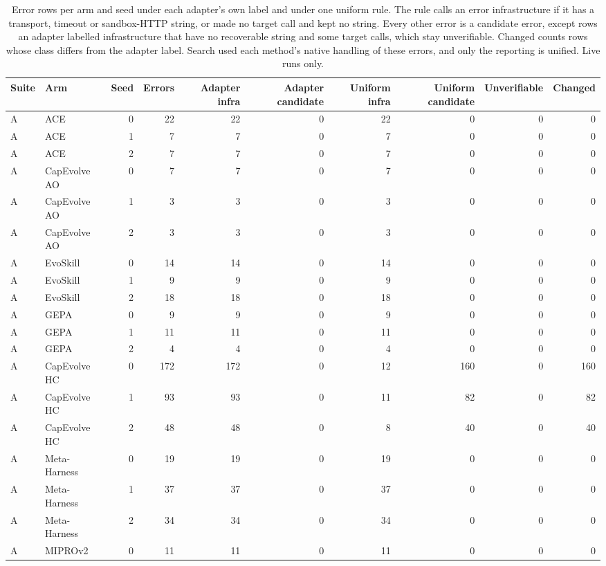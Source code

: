 \begin{table}[t]
\centering\scriptsize
\setlength{\tabcolsep}{4pt}
\caption{Error rows per arm and seed under each adapter's own label and under one uniform rule. The rule calls an error infrastructure if it has a transport, timeout or sandbox-HTTP string, or made no target call and kept no string. Every other error is a candidate error, except rows an adapter labelled infrastructure that have no recoverable string and some target calls, which stay unverifiable. Changed counts rows whose class differs from the adapter label. Search used each method's native handling of these errors, and only the reporting is unified. Live runs only.}
\label{tab:zeros}
\begin{tabular}{@{}llrrrrrrrr@{}}
\toprule
Suite & Arm & Seed & Errors & Adapter infra & Adapter candidate & Uniform infra & Uniform candidate & Unverifiable & Changed \\
\midrule
A & ACE & 0 & 22 & 22 & 0 & 22 & 0 & 0 & 0 \\
A & ACE & 1 & 7 & 7 & 0 & 7 & 0 & 0 & 0 \\
A & ACE & 2 & 7 & 7 & 0 & 7 & 0 & 0 & 0 \\
A & CapEvolve AO & 0 & 7 & 7 & 0 & 7 & 0 & 0 & 0 \\
A & CapEvolve AO & 1 & 3 & 3 & 0 & 3 & 0 & 0 & 0 \\
A & CapEvolve AO & 2 & 3 & 3 & 0 & 3 & 0 & 0 & 0 \\
A & EvoSkill & 0 & 14 & 14 & 0 & 14 & 0 & 0 & 0 \\
A & EvoSkill & 1 & 9 & 9 & 0 & 9 & 0 & 0 & 0 \\
A & EvoSkill & 2 & 18 & 18 & 0 & 18 & 0 & 0 & 0 \\
A & GEPA & 0 & 9 & 9 & 0 & 9 & 0 & 0 & 0 \\
A & GEPA & 1 & 11 & 11 & 0 & 11 & 0 & 0 & 0 \\
A & GEPA & 2 & 4 & 4 & 0 & 4 & 0 & 0 & 0 \\
A & CapEvolve HC & 0 & 172 & 172 & 0 & 12 & 160 & 0 & 160 \\
A & CapEvolve HC & 1 & 93 & 93 & 0 & 11 & 82 & 0 & 82 \\
A & CapEvolve HC & 2 & 48 & 48 & 0 & 8 & 40 & 0 & 40 \\
A & Meta-Harness & 0 & 19 & 19 & 0 & 19 & 0 & 0 & 0 \\
A & Meta-Harness & 1 & 37 & 37 & 0 & 37 & 0 & 0 & 0 \\
A & Meta-Harness & 2 & 34 & 34 & 0 & 34 & 0 & 0 & 0 \\
A & MIPROv2 & 0 & 11 & 11 & 0 & 11 & 0 & 0 & 0 \\

\end{tabular}
\end{table}
